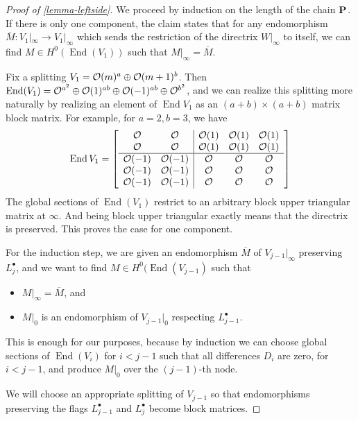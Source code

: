 \documentclass[11pt, two side, letterpaper, final]{amsart}
\renewcommand{\P}{{\bf P}}
\DeclareMathOperator{\End}{End}
\newcommand{\chain}[1]{\P_{#1}}
\begin{document}
\begin{proof}[Proof of \cref{lemma-leftside}]
We proceed by induction on the length of the chain $\chain{}$. If there is only one component, the claim states that for
any endomorphism $\overline{M}:V_1|_\infty \to V_1|_\infty$ which sends the restriction of the directrix $W|_{\infty}$  to itself,
we can find $M \in H^0(\End(V_1))$ such that $M|_\infty = \overline{M}$.

Fix a splitting $V_1 = {\mathcal O}(m)^a \oplus {\mathcal O}(m+1)^b$. Then $\End(V_1)= \sh{O}^{a^2} \oplus \sh{O}(1)^{ab} \oplus
\sh{O}(-1)^{ab} \oplus \sh{O}^{b^2}$, and we can realize this splitting more naturally by realizing an element of $\End V_1$ as an $(a+b) \times (a+b)$ matrix block matrix. For
example, for $a=2, b=3$, we have
\[
\End V_1 =
\left[
\begin{array}{cc|ccc}
\sh{O} & \sh{O} & \sh{O}(1) & \sh{O}(1) & \sh{O}(1) \\
\sh{O} & \sh{O} & \sh{O}(1) & \sh{O}(1) & \sh{O}(1) \\ \hline
\sh{O}(-1) & \sh{O}(-1) & \sh{O} & \sh{O} & \sh{O}  \\
\sh{O}(-1) & \sh{O}(-1) & \sh{O} & \sh{O} & \sh{O}  \\
\sh{O}(-1) & \sh{O}(-1) & \sh{O} & \sh{O} & \sh{O} 
\end{array}	
\right]
\]
The global sections of $\End(V_1)$ restrict to an arbitrary block upper triangular matrix at $\infty$. And being 
block upper triangular exactly means that the directrix is preserved. This proves the case for one component.

For the induction step, we are given an endomorphism $\overline{M}$ of $V_{j-1}|_{\infty}$ preserving $L^\bullet_j$,
and we want to find $M \in H^0(\End(V_{j-1})$ such that
\begin{itemize}
	\item $M|_{\infty}=\overline{M}$, and
	\item $M|_0$ is an endomorphism of $V_{j-1}|_0$ respecting $L^\bullet_{j-1}$.
\end{itemize}

This is enough for our purposes, because by induction we can choose global sections of $\End(V_i)$ for $i<j-1$ such that
all differences $D_i$ are zero, for $i<j-1$, and produce $M|_0$ over the $(j-1)$-th node.

We will choose an appropriate splitting of $V_{j-1}$ so that endomorphisms preserving the flags $L^\bullet_{j-1}$ 
and $L^\bullet_j$ become block matrices.


\end{proof}
\end{document}
